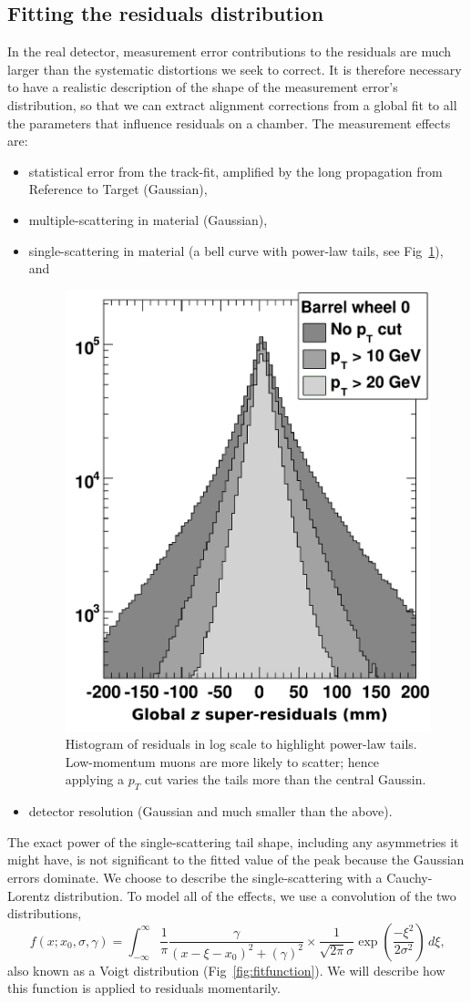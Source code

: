 \documentclass[12pt]{article}
\begin{document}
\subsection{Fitting the residuals distribution}
\label{sec:fitting}

In the real detector, measurement error contributions to the residuals
are much larger than the systematic distortions we seek to correct.
It is therefore necessary to have a realistic description of the shape
of the measurement error's distribution, so that we can extract
alignment corrections from a global fit to all the parameters that
influence residuals on a chamber.  The measurement effects are:
\begin{itemize}
\item statistical error from the track-fit, amplified by the long
  propagation from Reference to Target (Gaussian),
\item multiple-scattering in material (Gaussian),
\item single-scattering in material (a bell curve with power-law
  tails, see Fig~\ref{fig:residuals_barrel}), and

\begin{figure}
\begin{center} \includegraphics[width=0.4\linewidth]{residuals_barrel.pdf} \end{center}
\caption{Histogram of residuals in log scale to highlight power-law
  tails.  Low-momentum muons are more likely to scatter; hence
  applying a $p_T$ cut varies the tails more than the central Gaussin. \label{fig:residuals_barrel}}
\end{figure}

\item detector resolution (Gaussian and much smaller than the above).
\end{itemize}
The exact power of the single-scattering tail shape, including any
asymmetries it might have, is not significant to the fitted value of
the peak because the Gaussian errors dominate.  We choose to describe
the single-scattering with a Cauchy-Lorentz distribution.  To model
all of the effects, we use a convolution of the two distributions,
\begin{equation}
f(x; x_0, \sigma, \gamma) = \int_{-\infty}^\infty
\frac{1}{\pi}\frac{\gamma}{(x - \xi - x_0)^2 + (\gamma)^2} \times 
\frac{1}{\sqrt{2\pi} \sigma} \exp\left(\frac{-\xi^2}{2
  \sigma^2}\right) \, d\xi \mbox{,}
\label{eqn:fitfunction}
\end{equation}
also known as a Voigt distribution (Fig~\ref{fig:fitfunction}).  We
will describe how this function is applied to residuals momentarily.
\end{document}
